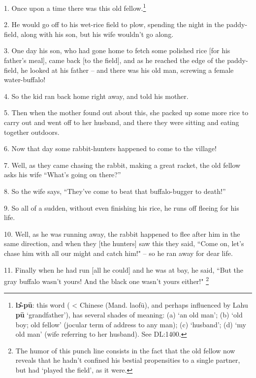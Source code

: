 \setcounter{footnote}{0}

1. Once upon a time there was this old fellow.\footnote{\textbf{lɔ̂-pū}: this word ( < Chinese  (Mand. laofū), and perhaps influenced by Lahu \textbf{pū} `grandfather'), has several shades of meaning: (a) `an old man'; (b) `old boy; old fellow' (jocular term of address to any man); (c) `husband'; (d) `my old man' (wife referring to her husband). See DL:1400.}

2. He would go off to his wet-rice field to plow, spending the night in the paddy-field,
along with his son, but his wife wouldn't go along.

3. One day his son, who had gone home to fetch some polished rice [for his father's
meal], came back [to the field], and as he reached the edge of the paddy-field,
he looked at his father -- and there was his old man, screwing a female water-buffalo!

4. So the kid ran back home right away, and told his mother.

5. Then when the mother found out about this, she packed up some more rice to carry
out and went off to her husband, and there they were sitting and eating together
outdoors.

6. Now that day some rabbit-hunters happened to come to the village!

7. Well, as they came chasing the rabbit, making a great racket, the old fellow
asks his wife ``What's going on there?''

8. So the wife says, ``They've come to beat that buffalo-bugger to death!''

9. So all of a sudden, without even finishing his rice, he runs off fleeing for
his life.

10. Well, as he was running away, the rabbit happened to flee after him in the
same direction, and when they [the hunters] saw this they said, ``Come
on, let's chase him with all our might and catch him!" -- so he ran away
for dear life.

11. Finally when he had run [all he could] and he was at bay, he said, ``But
the gray buffalo wasn't yours! And the black one wasn't yours either!"
\footnote{The humor of this punch line consists in the fact that the old fellow now reveals that he hadn't confined his bestial propensities to a single partner, but had `played the field', as it were.}

